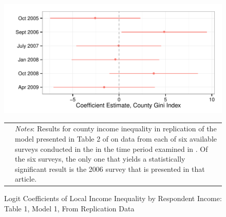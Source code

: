 \begin{figure}[htbp] 
  \caption{Logit Coefficients of Local Income Inequality by Respondent Income: Table 1, Model 1, From Replication Data}
  \label{F:coef.t1m1}
  \begin{center}
    \includegraphics[width=5.25in]{../figures/03_examine_all_available_data_t2_by_survey.pdf}
  \end{center}
  \begin{footnotesize}
  \begin{tabular}{p{.1in} p{5.1in}}
  & \emph{Notes}: Results for county income inequality in replication of the model presented in Table 2 of \citet{Newman2015} on data from each of six available surveys conducted in the in the time period examined in \citet{Newman2015}.  Of the six surveys, the only one that yields a statistically significant result is the 2006 survey that is presented in that article.
  \end{tabular}
  \end{footnotesize}
\end{figure}



